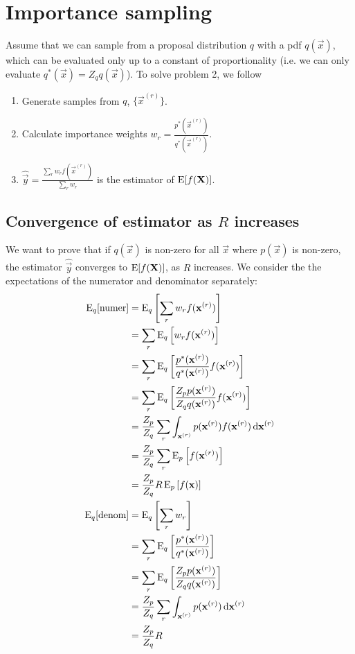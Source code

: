 \section{Importance sampling}

Assume that we can sample from a proposal distribution $q$ with a pdf $q(\vec x)$, which can be evaluated only up to a constant of proportionality (i.e. we can only evaluate $q^\ast(\vec x) = Z_q q(\vec x)$). To solve problem 2, we follow
\begin{enumerate}
    \item Generate samples from $q$, $\{\vec x^{(r)}\}$.
    \item Calculate importance weights $w_r = \frac{p^\ast(\vec x^{(r)})}{q^\ast(\vec x^{(r)})}$.
    \item $\hat{\vec y} = \frac{\sum_r w_r f(\vec x^{(r)})}{\sum_r w_r}$ is the estimator of $\operatorname{\mathrm{E}}[f(\boldsymbol{\mathbf{X}})]$.
\end{enumerate}

\subsection{Convergence of estimator as $R$ increases}
    We want to prove that if $q(\vec x)$ is non-zero for all $\vec x$ where $p(\vec x)$ is non-zero, the estimator $\hat{\vec y}$ converges to $\operatorname{\mathrm{E}}[f(\boldsymbol{\mathbf{X}})]$, as $R$ increases. We consider the the expectations of the numerator and denominator separately:
    \begin{align}
        \operatorname{\mathrm{E}}_q[\text{numer}]  &= \operatorname{\mathrm{E}}_q\left[\sum_r w_r f(\boldsymbol{\mathbf{x}}^{(r)})\right] \\
                            &= \sum_r \operatorname{\mathrm{E}}_q\left[w_r f(\boldsymbol{\mathbf{x}}^{(r)})\right] \\
                            &= \sum_r \operatorname{\mathrm{E}}_q\left[\frac{p^\ast(\boldsymbol{\mathbf{x}}^{(r)})}{q^\ast(\boldsymbol{\mathbf{x}}^{(r)})} f(\boldsymbol{\mathbf{x}}^{(r)})\right] \\
                            &= \sum_r \operatorname{\mathrm{E}}_q\left[\frac{Z_p p(\boldsymbol{\mathbf{x}}^{(r)})}{Z_q q(\boldsymbol{\mathbf{x}}^{(r)})} f(\boldsymbol{\mathbf{x}}^{(r)})\right] \\
                            &= \frac{Z_p}{Z_q} \sum_r \int_{\boldsymbol{\mathbf{x}}^{(r)}} p(\boldsymbol{\mathbf{x}}^{(r)}) f(\boldsymbol{\mathbf{x}}^{(r)}) \, \mathrm d \boldsymbol{\mathbf{x}}^{(r)} \\
                            &= \frac{Z_p}{Z_q} \sum_r \operatorname{\mathrm{E}}_p\left[f(\boldsymbol{\mathbf{x}}^{(r)})\right] \\
                            &= \frac{Z_p}{Z_q} R \operatorname{\mathrm{E}}_p\left[f(\boldsymbol{\mathbf{x}})\right] \\
        \operatorname{\mathrm{E}}_q[\text{denom}]  &= \operatorname{\mathrm{E}}_q\left[\sum_r w_r\right] \\
                            &= \sum_r \operatorname{\mathrm{E}}_q\left[\frac{p^\ast(\boldsymbol{\mathbf{x}}^{(r)})}{q^\ast(\boldsymbol{\mathbf{x}}^{(r)})}\right] \\
                            &= \sum_r \operatorname{\mathrm{E}}_q\left[\frac{Z_p p(\boldsymbol{\mathbf{x}}^{(r)})}{Z_q q(\boldsymbol{\mathbf{x}}^{(r)})}\right] \\
                            &= \frac{Z_p}{Z_q} \sum_r \int_{\boldsymbol{\mathbf{x}}^{(r)}} p(\boldsymbol{\mathbf{x}}^{(r)}) \,\mathrm d \boldsymbol{\mathbf{x}}^{(r)} \\
                            &= \frac{Z_p}{Z_q} R
    \end{align}

